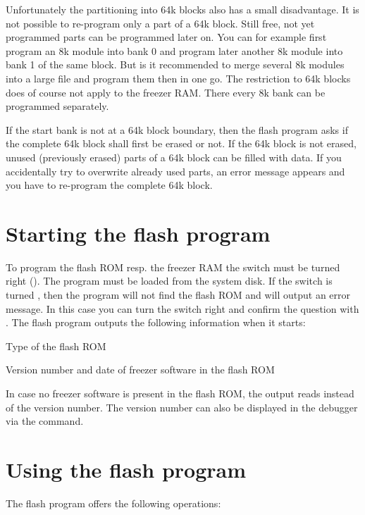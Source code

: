 Unfortunately the partitioning into 64k blocks also has a small disadvantage. It
is not possible to re-program only a part of a 64k block. Still free, not yet
programmed parts can be programmed later on. You can for example first program
an 8k module into bank 0 and program later another 8k module into bank 1 of the
same block. But is it recommended to merge several \eg 8k modules into a large
file and program them then in one go. The restriction to 64k blocks does of
course not apply to the freezer RAM. There every 8k bank can be programmed
separately.

If the start bank is not at a 64k block boundary, then the flash program asks if
the complete 64k block shall first be erased or not. If the 64k block is not
erased, unused (\eg previously erased) parts of a 64k block can be filled with
data. If you accidentally try to overwrite already used parts, an error message
appears and you have to re-program the complete 64k block.

\section{Starting the flash program}
To program the flash ROM resp. the freezer RAM the  switch must
be turned right (). The program  must be loaded
from the system disk. If the switch is turned , then the program will not
find the flash ROM and will output an error message.
In this case you can turn the switch right and confirm the question
 with . The flash program outputs the following
information when it starts:

\begin{itemize*}
\item Type of the flash ROM
\item Version number and date of freezer software in the flash ROM
\end{itemize*}

In case no freezer software is present in the flash ROM, the output reads
 instead of the version number. The version number can also be
displayed in the debugger via the  command.

\section{Using the flash program}
The flash program offers the following operations:


